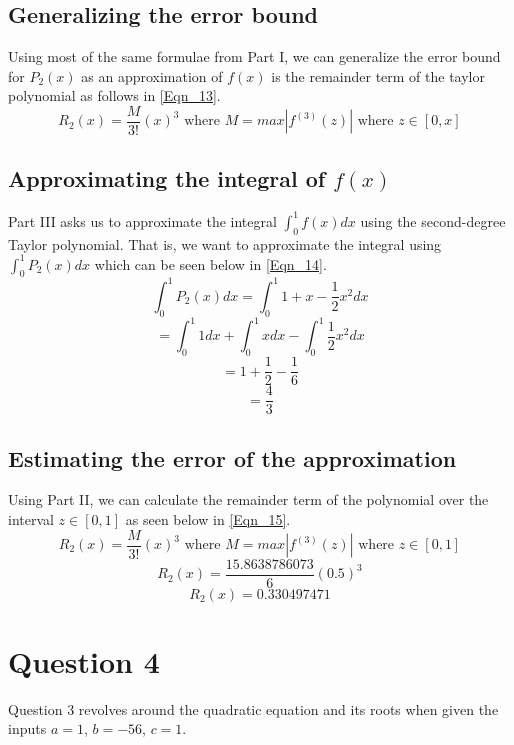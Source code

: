 \documentclass{article}
\begin{document}
\subsection{Generalizing the error bound}
Using most of the same formulae from Part I, we can generalize the error bound for \(P_2(x)\) as an approximation of \(f(x)\) is the remainder term of the taylor polynomial as follows in \ref{Eqn_13}.
\begin{equation}
    \label{Eqn_13}
    R_2(x) = \frac{M}{3!}(x)^3 \mbox{ where } M = max|f^{(3)}(z)| \mbox{ where } z \in [0,x]
\end{equation}
\subsection{Approximating the integral of \(f(x)\)}
Part III asks us to approximate the integral \(\int_{0}^{1}f(x)dx\) using the second-degree Taylor polynomial. That is, we want to approximate the integral using \(\int_{0}^{1}P_2(x)dx\) which can be seen below in \ref{Eqn_14}.
\begin{equation}
    \label{Eqn_14}
    \int_{0}^{1}P_2(x)dx = \int_{0}^{1} 1 + x - \frac{1}{2}x^2 dx
\end{equation}
\[
= \int_{0}^{1} 1 dx + \int_{0}^{1} x dx - \int_{0}^{1} \frac{1}{2}x^2 dx
\]
\[
= 1 + \frac{1}{2} - \frac{1}{6}
\]
\[
= \frac{4}{3}
\]
\subsection{Estimating the error of the approximation}
Using Part II, we can calculate the remainder term of the polynomial over the interval \(z \in [0,1]\) as seen below in \ref{Eqn_15}.
\begin{equation}
    \label{Eqn_15}
    R_2(x) = \frac{M}{3!}(x)^3 \mbox{ where } M = max|f^{(3)}(z)| \mbox{ where } z \in [0,1]
\end{equation}
\[
R_2(x) = \frac{15.8638786073}{6}(0.5)^3
\]
\[
R_2(x) = 0.330497471
\]


\section{Question 4}
Question 3 revolves around the quadratic equation and its roots when given the inputs \(a=1\), \(b=-56\), \(c=1\).
\end{document}
